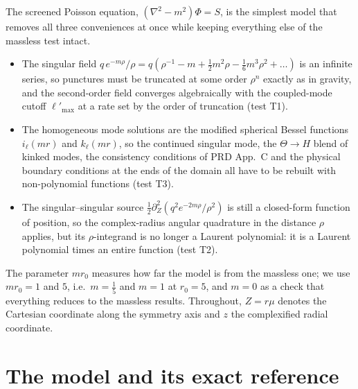 \documentclass[11pt,a4paper]{article}
\newcommand{\lpm}{{\ell'_{\max}}}
\begin{document}
The screened Poisson equation, $(\nabla^2-m^2)\Phi=S$, is the simplest model that removes all three conveniences at once while keeping everything else of the massless test intact.
\begin{itemize}[leftmargin=*]
\item The singular field $q\,e^{-m\rho}/\rho=q(\rho^{-1}-m+\tfrac12m^2\rho-\tfrac16m^3\rho^2+\dots)$ is an infinite series, so punctures must be truncated at some order $\rho^n$ exactly as in gravity, and the second-order field converges algebraically with the coupled-mode cutoff $\lpm$ at a rate set by the order of truncation (test T1).
\item The homogeneous mode solutions are the modified spherical Bessel functions $i_\ell(mr)$ and $k_\ell(mr)$, so the continued singular mode, the $\Theta\to H$ blend of kinked modes, the consistency conditions of PRD App.~C and the physical boundary conditions at the ends of the domain all have to be rebuilt with non-polynomial functions (test T3).
\item The singular--singular source $\tfrac12\partial_Z^2(q^2e^{-2m\rho}/\rho^2)$ is still a closed-form function of position, so the complex-radius angular quadrature in the distance $\rho$ applies, but its $\rho$-integrand is no longer a Laurent polynomial: it is a Laurent polynomial times an entire function (test T2).
\end{itemize}
The parameter $m r_0$ measures how far the model is from the massless one; we use $mr_0=1$ and $5$, i.e.\ $m=\tfrac15$ and $m=1$ at $r_0=5$, and $m=0$ as a check that everything reduces to the massless results.
Throughout, $Z=r\mu$ denotes the Cartesian coordinate along the symmetry axis and $z$ the complexified radial coordinate.

\section{The model and its exact reference}\label{sec:model}
\end{document}
